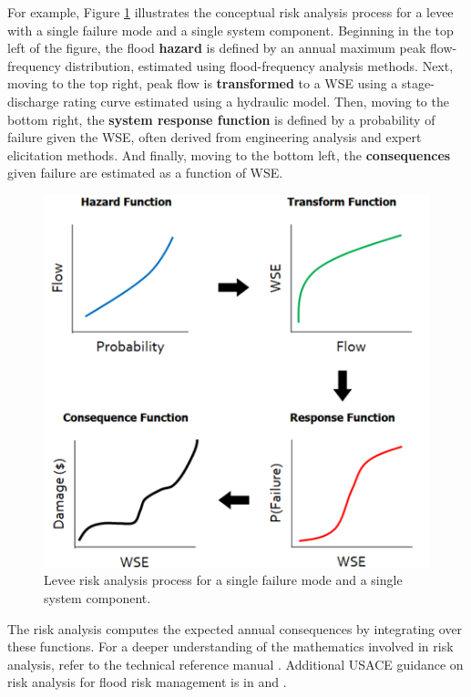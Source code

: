 \documentclass[
]{book}
\begin{document}
For example, Figure \ref{fig:figure-0} illustrates the conceptual risk analysis process for a levee with a single failure mode and a single system component. Beginning in the top left of the figure, the flood \textbf{hazard} is defined by an annual maximum peak flow-frequency distribution, estimated using flood-frequency analysis methods. Next, moving to the top right, peak flow is \textbf{transformed} to a WSE using a stage-discharge rating curve estimated using a hydraulic model. Then, moving to the bottom right, the \textbf{system response function} is defined by a probability of failure given the WSE, often derived from engineering analysis and expert elicitation methods. And finally, moving to the bottom left, the \textbf{consequences} given failure are estimated as a function of WSE.

\begin{figure}

{\centering \includegraphics{images/figure0} 

}

\caption{Levee risk analysis process for a single failure mode and a single system component.}\label{fig:figure-0}
\end{figure}

The risk analysis computes the expected annual consequences by integrating over these functions. For a deeper understanding of the mathematics involved in risk analysis, refer to the technical reference manual \citep{cite-TechRef}. Additional USACE guidance on risk analysis for flood risk management is in \citep{cite-EM1619} and \citep{cite-BestPractices}.
\end{document}
